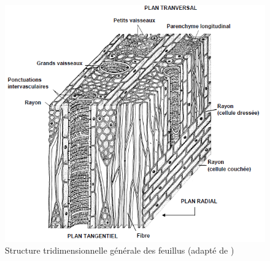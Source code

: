 \begin{figure}[h]
\centering
\includegraphics[scale=0.7]{img/ch4_Fahn_feu}
\caption{Structure tridimensionnelle générale des feuillus (adapté de \cite{fahn1990plant})}
\label{fig:Fahn_feu}
\end{figure}
%
%
%
%
%
%
%
%
%
%
%
